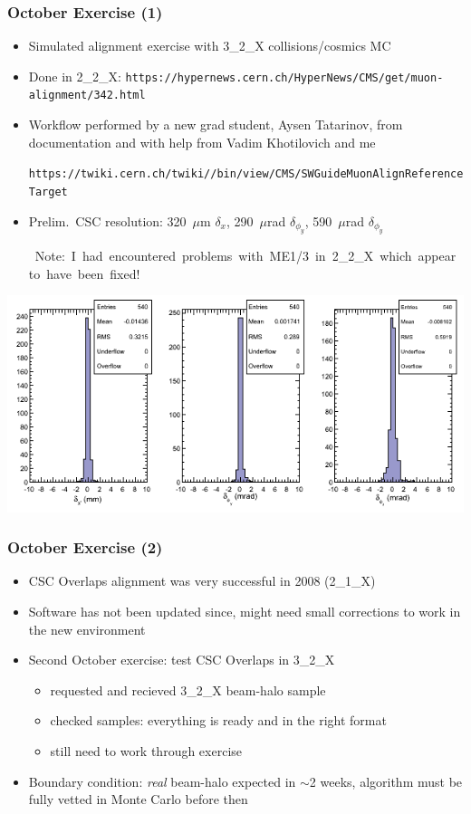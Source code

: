 \documentclass[compress]{beamer}
\begin{document}
\begin{frame}
\frametitle{October Exercise (1)}
\begin{itemize}
\item Simulated alignment exercise with 3\_2\_X collisions/cosmics MC
\item Done in 2\_2\_X: \mbox{\tt \tiny https://hypernews.cern.ch/HyperNews/CMS/get/muon-alignment/342.html\hspace{-1 cm}}

\item Workflow performed by a new grad student, Aysen Tatarinov, from documentation and with help from Vadim Khotilovich and me

{\tt \tiny https://twiki.cern.ch/twiki//bin/view/CMS/SWGuideMuonAlignReferenceTarget}

\item Prelim.\ CSC resolution: 320~$\mu$m $\delta_x$, 290~$\mu$rad $\delta_{\phi_y}$, 590~$\mu$rad $\delta_{\phi_y}$

\mbox{\hspace{-1 cm} \scriptsize Note: I had encountered problems with ME1/3 in 2\_2\_X which appear to have been fixed!\hspace{-1 cm}}

\end{itemize}
\begin{center}
\includegraphics[width=0.9\linewidth]{only3_CSC.png}
\end{center}
\end{frame}

\begin{frame}
\frametitle{October Exercise (2)}
\begin{itemize}\setlength{\itemsep}{0.3 cm}
\item CSC Overlaps alignment was very successful in 2008 (2\_1\_X)
\item Software has not been updated since, might need small corrections to work in the new environment
\item Second October exercise: test CSC Overlaps in 3\_2\_X
\begin{itemize}
\item requested and recieved 3\_2\_X beam-halo sample
\item checked samples: everything is ready and in the right format
\item still need to work through exercise
\end{itemize}
\item Boundary condition: {\it real} beam-halo expected in $\sim$2
  weeks, algorithm must be fully vetted in Monte Carlo before then
\end{itemize}
\end{frame}
\end{document}
